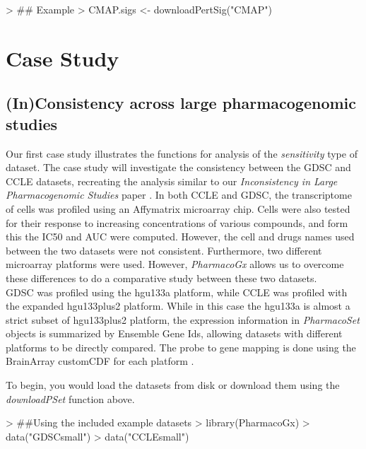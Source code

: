 \documentclass[11pt]{article}
\begin{document}
\begin{Schunk}
\begin{Sinput}
> ## Example
> CMAP.sigs <- downloadPertSig("CMAP")
\end{Sinput}
\end{Schunk}

\section{Case Study}

\subsection{(In)Consistency across large pharmacogenomic studies}
Our first case study illustrates the functions for analysis of the \textit{sensitivity} type of dataset. The case study will investigate the consistency between the GDSC and CCLE datasets, recreating the analysis similar to our \textit{Inconsistency in Large Pharmacogenomic Studies} paper \cite{haibe-kains_inconsistency_2013}. In both CCLE and GDSC, the transcriptome of cells was profiled using an Affymatrix microarray chip. Cells were also tested for their response to increasing concentrations of various compounds, and form this the IC50 and AUC were computed. However, the cell and drugs names used between the two datasets were not consistent. Furthermore, two different microarray platforms were used. However, \textit{PharmacoGx} allows us to overcome these differences to do a comparative study between these two datasets. \\


GDSC was profiled using the hgu133a platform, while CCLE was profiled with the expanded hgu133plus2 platform. While in this case the hgu133a is almost a strict subset of hgu133plus2 platform, the expression information in \textit{PharmacoSet} objects is summarized by Ensemble Gene Ids, allowing datasets with different platforms to be directly compared. The probe to gene mapping is done using the BrainArray customCDF for each platform \cite{sabatti_thresholding_2002}.

To begin, you would load the datasets from disk or download them using the \textit{downloadPSet} function above. 

\begin{Schunk}
\begin{Sinput}
>   ##Using the included example datasets
>   library(PharmacoGx)
>   data("GDSCsmall")
>   data("CCLEsmall")
\end{Sinput}
\end{Schunk}
\end{document}

